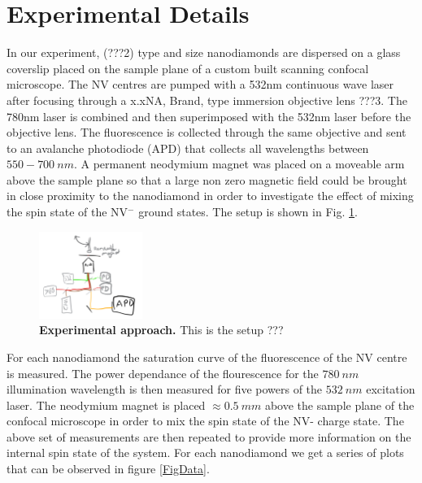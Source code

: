 \documentclass[,prl,twocolumn]{revtex4}
\begin{document}
\section{Experimental Details}
In our experiment, (???2) type and size nanodiamonds are dispersed on a glass coverslip placed on the sample plane of a custom built scanning confocal microscope. The NV centres are pumped with a 532nm continuous wave laser after focusing through a x.xNA, Brand, type immersion objective lens ???3. The 780nm laser is combined and then superimposed with the 532nm laser before the objective lens. The fluorescence is collected through the same objective and sent to an avalanche photodiode (APD) that collects all wavelengths between $550-\SI{700}{nm}$. A permanent neodymium magnet was placed on a moveable arm above the sample plane so that a large non zero magnetic field could be brought in close proximity to the nanodiamond in order to investigate the effect of mixing the spin state of the NV$^-$ ground states. The setup is shown in Fig. \ref{FigSetup}.

\begin{figure}[t]
  \centering
  \includegraphics[width=0.3\textwidth]{Setup.png} 
 \caption{\textbf{Experimental approach.} This is the setup ???} \label{FigSetup}
\end{figure}

For each nanodiamond the saturation curve of the fluorescence of the NV centre is measured. The power dependance of the flourescence for the $\SI{780}{nm}$ illumination wavelength is then measured for five powers of the $\SI{532}{nm}$ excitation laser. The neodymium magnet is placed $\approx \SI{0.5}{mm}$ above the sample plane of the confocal microscope in order to mix the spin state of the NV- charge state. The above set of measurements are then repeated to provide more information on the internal spin state of the system. For each nanodiamond we get a series of plots that can be observed in figure \ref{FigData}.
\end{document}
